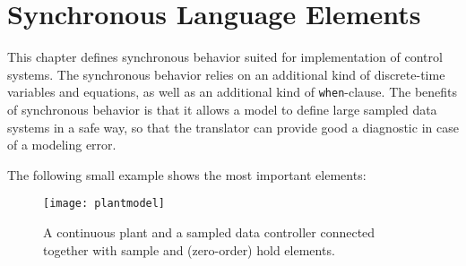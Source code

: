\chapter{Synchronous Language Elements}\label{synchronous-language-elements}

This chapter defines synchronous behavior suited for implementation of control systems.
The synchronous behavior relies on an additional kind of discrete-time variables and equations, as well as an additional kind of \lstinline!when!-clause.
The benefits of synchronous behavior is that it allows a model to define large sampled data systems in a safe way, so that the translator can provide good a diagnostic in case of a modeling error.

The following small example shows the most important elements:
\begin{figure}[H]
  \begin{center}
    \texttt{[image: plantmodel]}
  \end{center}
  \caption{
    A continuous plant and a sampled data controller connected together with sample and (zero-order) hold elements.
  }
\end{figure}

